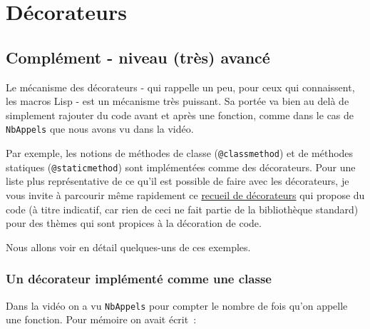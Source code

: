     
    
    
    

    

    \hypertarget{duxe9corateurs}{%
\section{Décorateurs}\label{duxe9corateurs}}

    \hypertarget{compluxe9ment---niveau-truxe8s-avancuxe9}{%
\subsection{Complément - niveau (très)
avancé}\label{compluxe9ment---niveau-truxe8s-avancuxe9}}

    Le mécanisme des décorateurs - qui rappelle un peu, pour ceux qui
connaissent, les macros Lisp - est un mécanisme très puissant. Sa portée
va bien au delà de simplement rajouter du code avant et après une
fonction, comme dans le cas de \texttt{NbAppels} que nous avons vu dans
la vidéo.

Par exemple, les notions de méthodes de classe (\texttt{@classmethod})
et de méthodes statiques (\texttt{@staticmethod}) sont implémentées
comme des décorateurs. Pour une liste plus représentative de ce qu'il
est possible de faire avec les décorateurs, je vous invite à parcourir
même rapidement ce
\href{https://wiki.python.org/moin/PythonDecoratorLibrary}{recueil de
décorateurs} qui propose du code (à titre indicatif, car rien de ceci ne
fait partie de la bibliothèque standard) pour des thèmes qui sont
propices à la décoration de code.

Nous allons voir en détail quelques-uns de ces exemples.

    \hypertarget{un-duxe9corateur-impluxe9mentuxe9-comme-une-classe}{%
\subsubsection{Un décorateur implémenté comme une
classe}\label{un-duxe9corateur-impluxe9mentuxe9-comme-une-classe}}

    Dans la vidéo on a vu \texttt{NbAppels} pour compter le nombre de fois
qu'on appelle une fonction. Pour mémoire on avait écrit~:

